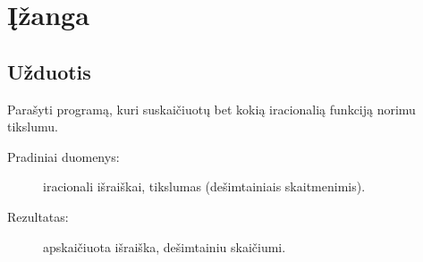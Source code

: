 \chapter{Įžanga}

\section{Užduotis}

Parašyti programą, kuri suskaičiuotų bet kokią iracionalią funkciją norimu
tikslumu.

\begin{description}
  \item[Pradiniai duomenys:] iracionali išraiškai, tikslumas (dešimtainiais 
    skaitmenimis).
  \item[Rezultatas:] apskaičiuota išraiška, dešimtainiu skaičiumi.
\end{description}




